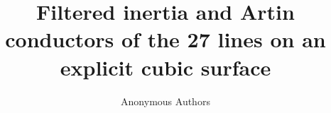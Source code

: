 \documentclass[11pt,reqno]{amsart}
\title[Filtered inertia of the 27 lines]{Filtered inertia and Artin conductors of the 27 lines on an explicit cubic surface}
\author{Anonymous Authors}
\date{}
\theoremstyle{definition}
\theoremstyle{remark}
\numberwithin{equation}{section}
\begin{document}
\raggedbottom

\begin{abstract}

\end{abstract}

\maketitle










\appendix








\end{document}
